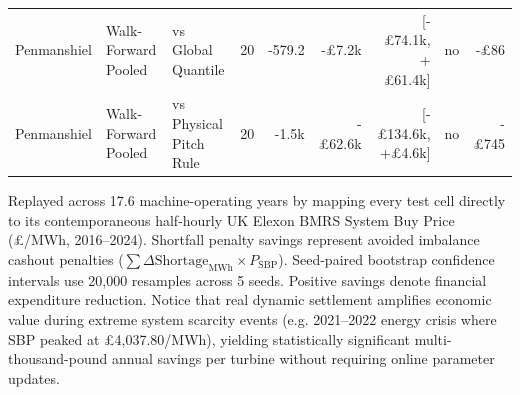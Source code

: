 \begin{table}[t]
\begin{tabular*}{\textwidth}{@{\extracolsep{\fill}}lllcrrrcr@{}}
Penmanshiel & Walk-Forward Pooled & vs Global Quantile & 20 & -579.2 & -£7.2k & [-£74.1k, +£61.4k] & no & -£86 \\
Penmanshiel & Walk-Forward Pooled & vs Physical Pitch Rule & 20 & -1.5k & -£62.6k & [-£134.6k, +£4.6k] & no & -£745 \\
\midrule
\bottomrule
\end{tabular*}
\vspace{1mm}
\footnotesize Replayed across 17.6 machine-operating years by mapping every test cell directly to its contemporaneous half-hourly UK Elexon BMRS System Buy Price (£/MWh, 2016--2024). Shortfall penalty savings represent avoided imbalance cashout penalties ($\sum \Delta\text{Shortage}_{\mathrm{MWh}} \times P_{\mathrm{SBP}}$). Seed-paired bootstrap confidence intervals use 20,000 resamples across 5 seeds. Positive savings denote financial expenditure reduction. Notice that real dynamic settlement amplifies economic value during extreme system scarcity events (e.g. 2021--2022 energy crisis where SBP peaked at £4,037.80/MWh), yielding statistically significant multi-thousand-pound annual savings per turbine without requiring online parameter updates.
\end{table}
